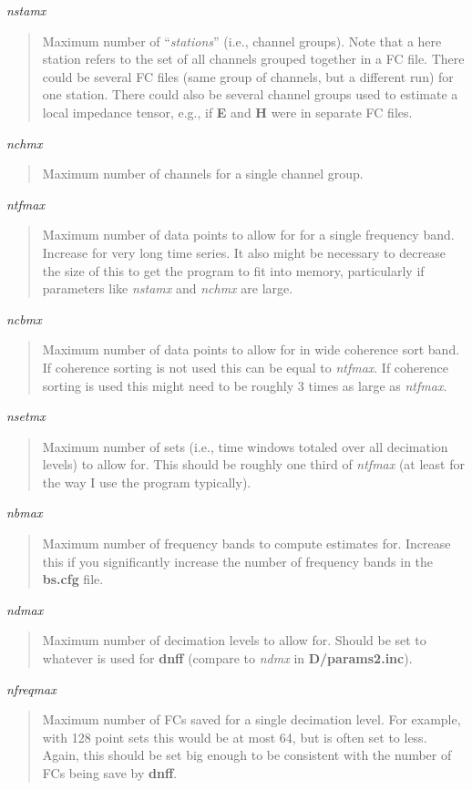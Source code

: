{\it nstamx} 
\begin{quote}
Maximum number of ``{\it stations}'' (i.e., channel groups).
Note that a here station refers to the set of all channels grouped 
together in a FC file.  There
could be several FC files (same group of channels, but a different run)
for one station.  There could also be several channel groups used to 
estimate a local impedance tensor, e.g., if {\bf E} and {\bf H}
were in separate FC files.
\end{quote}

{\it nchmx}
\begin{quote}
 Maximum number of channels for a single channel group.
\end{quote}

{\it ntfmax}
\begin{quote}
Maximum number of data points to allow for for a single
frequency band.  Increase for very long time series. It also might be
necessary to decrease the size of this to get the program to fit into 
memory, particularly if parameters like {\it nstamx} and {\it nchmx}
are large.
\end{quote}

{\it ncbmx}
\begin{quote}
Maximum number of data points to allow for in
wide coherence sort band.  If coherence sorting is not used this can be
equal to {\it ntfmax}.  If coherence sorting is used this might need to be
roughly 3 times as large as {\it ntfmax}.
\end{quote}

{\it nsetmx}
\begin{quote}
Maximum number of sets (i.e., time windows totaled
over all decimation levels) to allow for.  This should be roughly one third
of {\it ntfmax} (at least for the way I use the program typically).
\end{quote}

{\it nbmax}
\begin{quote}
 Maximum number of frequency bands to compute estimates
for.  Increase this if you significantly increase the number of 
frequency bands in the {\bf bs.cfg} file.
\end{quote}

{\it ndmax}
\begin{quote}
Maximum number of decimation levels to allow for.  Should be
set to whatever is used for {\bf dnff} 
(compare to {\it ndmx} in {\bf D/params2.inc}).
\end{quote}

{\it nfreqmax}
\begin{quote}
Maximum number of FCs saved for a single decimation
level.  For example, with 128 point sets this would be at most 64,
but is often set to less.  Again, this should be set big enough
to be consistent with the number of FCs being save by {\bf dnff}.
\end{quote}

